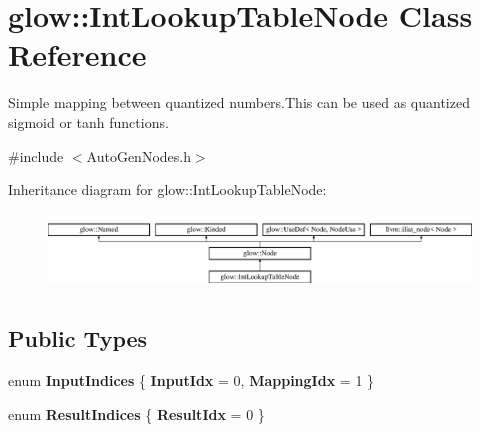 \hypertarget{classglow_1_1_int_lookup_table_node}{}\section{glow\+:\+:Int\+Lookup\+Table\+Node Class Reference}
\label{classglow_1_1_int_lookup_table_node}


Simple mapping between quantized numbers.\+This can be used as quantized sigmoid or tanh functions.  




{\ttfamily \#include $<$Auto\+Gen\+Nodes.\+h$>$}

Inheritance diagram for glow\+:\+:Int\+Lookup\+Table\+Node\+:\begin{figure}[H]
\begin{center}
\leavevmode
\includegraphics[height=2.028986cm]{classglow_1_1_int_lookup_table_node}
\end{center}
\end{figure}
\subsection*{Public Types}
\begin{DoxyCompactItemize}
\item 
\mbox{\label{classglow_1_1_int_lookup_table_node_a79fc4d58a702a57b7128680347d1b383}} 
enum {\bfseries Input\+Indices} \{ {\bfseries Input\+Idx} = 0, 
{\bfseries Mapping\+Idx} = 1
 \}
\item 
\mbox{\label{classglow_1_1_int_lookup_table_node_a3d793d84a35a706bd922e366a3b6e112}} 
enum {\bfseries Result\+Indices} \{ {\bfseries Result\+Idx} = 0
 \}
\end{DoxyCompactItemize}
